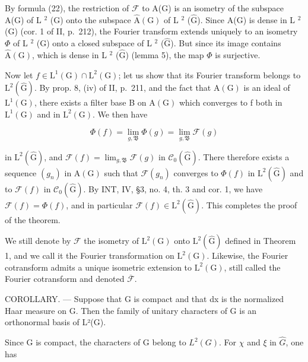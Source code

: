 By formula (22), the restriction of \(\mathcal{F}\) to A(G) is an isometry of the subspace A(G) of L \(^2\) (G) onto the subspace \(\hat{\mathrm{A}}(\mathrm{G})\) of L \(^2\) (\(\hat{\mathrm{G}}\)). Since A(G) is dense in L \(^2\) (G) (cor. 1 of II, p.~212), the Fourier transform extends uniquely to an isometry \(\Phi\) of L \(^2\) (G) onto a closed subspace of L \(^2\) (\(\hat{\mathrm{G}}\)). But since its image contains \(\hat{\mathrm{A}}(\mathrm{G})\), which is dense in L \(^2\) (\(\hat{\mathrm{G}}\)) (lemma 5), the map \(\Phi\) is surjective.

Now let \(f \in \mathrm{L}^{1}(\mathrm{G}) \cap \mathrm{L}^{2}(\mathrm{G})\); let us show that its Fourier transform belongs to \(\mathrm{L}^{2}(\widehat{\mathrm{G}})\). By prop. 8, (iv) of II, p.~211, and the fact that \(\mathrm{A}(\mathrm{G})\) is an ideal of \(\mathrm{L}^{1}(\mathrm{G})\), there exists a filter base B on \(\mathrm{A}(\mathrm{G})\) which converges to f both in \(\mathrm{L}^{1}(\mathrm{G})\) and in \(\mathrm{L}^{2}(\mathrm{G})\). We then have

\[
\Phi (f) = \lim _ {g, \mathfrak {B}} \Phi (g) = \lim _ {g, \mathfrak {B}} \mathcal {F} (g)
\]

in \(\mathrm{L}^{2}(\widehat{\mathrm{G}})\), and \(\mathcal{F}(f)=\lim_{g,\mathfrak{B}}\mathcal{F}(g)\) in \(\mathcal{C}_{0}(\widehat{\mathrm{G}})\). There therefore exists a sequence \((g_{n})\) in \(\mathrm{A}(\mathrm{G})\) such that \(\mathcal{F}(g_{n})\) converges to \(\Phi(f)\) in \(\mathrm{L}^{2}(\widehat{\mathrm{G}})\) and to \(\mathcal{F}(f)\) in \(\mathcal{C}_{0}(\widehat{\mathrm{G}})\). By INT, IV, §3, no. 4, th. 3 and cor. 1, we have \(\mathcal{F}(f)=\Phi(f)\), and in particular \(\mathcal{F}(f)\in\mathrm{L}^{2}(\widehat{\mathrm{G}})\). This completes the proof of the theorem.

We still denote by \(\mathcal{F}\) the isometry of \(\mathrm{L}^2 (\mathrm{G})\) onto \(\mathrm{L}^2 (\widehat{\mathrm{G}})\) defined in Theorem 1, and we call it the Fourier transformation on \(\mathrm{L}^2 (\mathrm{G})\). Likewise, the Fourier cotransform admits a unique isometric extension to \(\mathrm{L}^2 (\mathrm{G})\), still called the Fourier cotransform and denoted \(\overline{\mathcal{F}}\).

COROLLARY. --- Suppose that G is compact and that dx is the normalized Haar measure on G. Then the family of unitary characters of G is an orthonormal basis of L²(G).

Since G is compact, the characters of G belong to \(L^{2}(G)\). For \(\chi\) and \(\xi\) in \(\widehat{G}\), one has

